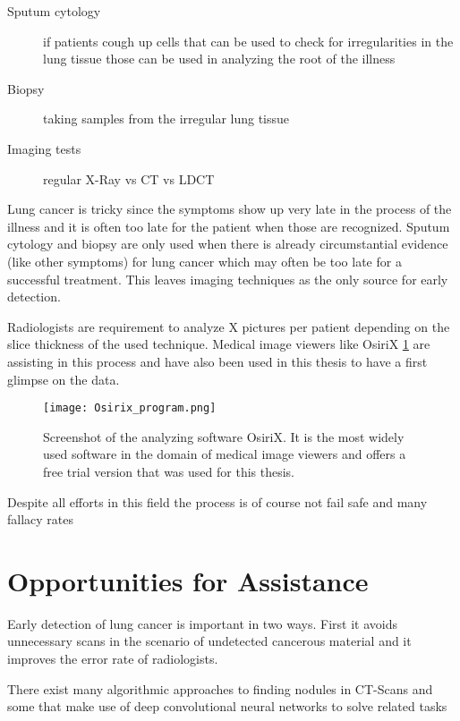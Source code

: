 \documentclass[main.tex]{subfiles}
\begin{document}
\begin{description}
\item[Sputum cytology] if patients cough up cells that can be used to check for irregularities in the lung tissue those can be used in analyzing the root of the illness
\item[Biopsy] taking samples from the irregular lung tissue
\item[Imaging tests] regular X-Ray vs CT vs LDCT 
\end{description}

Lung cancer is tricky since the symptoms show up very late in the process of the illness and it is often too late for the patient when those are recognized. Sputum cytology and biopsy are only used when there is already circumstantial evidence (like other symptoms) for lung cancer which may often be too late for a successful treatment. This leaves imaging techniques as the only source for early detection.

Radiologists are requirement to analyze X pictures per patient depending on the slice thickness of the used technique. Medical image viewers like OsiriX \ref{fig:osirix} are assisting in this process and have also been used in this thesis to have a first glimpse on the data.

\begin{figure}[ht]
\texttt{[image: Osirix\_program.png]}
\caption{Screenshot of the analyzing software OsiriX. It is the most widely used software in the domain of medical image viewers and offers a free trial version that was used for this thesis.}
\label{fig:osirix}
\end{figure}

Despite all efforts in this field the process is of course not fail safe and many 
fallacy rates

\section{Opportunities for Assistance}

Early detection of lung cancer is important in two ways. First it avoids unnecessary scans in the scenario of undetected cancerous material and it improves the error rate of radiologists.

There exist many algorithmic approaches to finding nodules in CT-Scans \cite{papers_classical} and some that make use of deep convolutional neural networks to solve related tasks \cite{papers_dnn}\\
\end{document}
